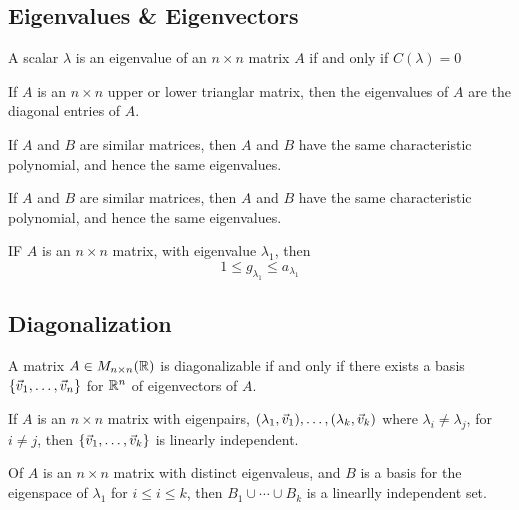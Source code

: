 \documentclass[english,12pt]{article}
\begin{document}
\subsection{Eigenvalues \& Eigenvectors}


\begin{thrm}
A scalar $\lambda$ is an eigenvalue of an $n \times n$ matrix $A$ if and only if $C(\lambda) = 0$
\end{thrm}

\begin{thrm}
If $A$ is an $n \times n$ upper or lower trianglar matrix, then the eigenvalues of $A$ are the diagonal entries of $A$.
\end{thrm}

\begin{thrm}
If $A$ and $B$ are similar matrices, then $A$ and $B$ have the same characteristic polynomial, and hence the same eigenvalues.
\end{thrm}

\begin{thrm}
If $A$ and $B$ are similar matrices, then $A$ and $B$ have the same characteristic polynomial, and hence the same eigenvalues.
\end{thrm}

\begin{thrm}
IF $A$ is an $n \times n$ matrix, with eigenvalue $\lambda_1$, then
\[1 \leq g_{\lambda_1} \leq a_{\lambda_1}\]
\end{thrm}

\subsection{Diagonalization}

\begin{thrm}
A matrix $A \in M_{n \times n}({\mathbb{R}})$ is diagonalizable if and only if there exists a basis $\{\vec{v}_1,\dots,\vec{v}_n\}$ for ${\mathbb{R}}^n$ of eigenvectors of $A$.
\end{thrm}


\begin{thrm}
If $A$ is an $n \times n$ matrix with eigenpairs,
$(\lambda_1,\vec{v}_1),\dots,(\lambda_k,\vec{v}_k)$ where $\lambda_i \neq \lambda_j$, for $i \neq j$, then $\{\vec{v}_1,\dots,\vec{v}_k\}$ is linearly independent.
\end{thrm}

\begin{thrm}
Of $A$ is an $ n\times n$ matrix with distinct eigenvaleus, and $B$ is a basis for the eigenspace of $\lambda_1$ for $i \leq i \leq k$, then $B_1 \cup \cdots \cup B_k$ is a linearlly independent set.
\end{thrm}
\end{document}
